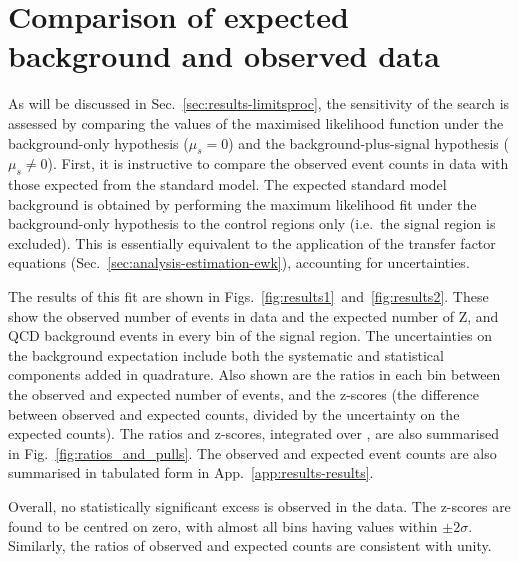 \section{Comparison of expected background and observed data}
\label{sec:results-results}
As will be discussed in Sec.~\ref{sec:results-limitsproc}, the sensitivity of 
the search is assessed by 
comparing the values of the maximised likelihood function under the 
background-only hypothesis ($\mu_s=0$) and the background-plus-signal 
hypothesis ($\mu_s \ne 0$). First, it is instructive to compare the observed 
event counts in 
data with those expected from the standard model. The expected standard model 
background is obtained by performing the maximum likelihood fit under the 
background-only hypothesis to the control regions only (i.e.\ the signal region 
is excluded). This is essentially equivalent to the application of the transfer 
factor equations (Sec.~\ref{sec:analysis-estimation-ewk}), accounting for 
uncertainties.

The results of this fit are shown in 
Figs.~\ref{fig:results1}~and~\ref{fig:results2}.
These show the observed number of events in data and the expected number of 
Z, \ttw and QCD background events in every \njnbhtmht bin of the signal 
region. The uncertainties on the background expectation include both the 
systematic and statistical components added in quadrature. 
Also shown are the ratios in each bin between the observed and expected number 
of events, and the z-scores (the difference between observed and expected 
counts, divided by the uncertainty on the expected counts).
The ratios and z-scores, integrated over \mht, are also summarised in 
Fig.~\ref{fig:ratios_and_pulls}.
The observed and expected event counts are also summarised in tabulated form in 
App.~\ref{app:results-results}.

Overall, no statistically significant excess is observed in the data.
The z-scores are found to be centred on zero, with almost all bins having 
values within $\pm2\sigma$.
Similarly, the ratios of observed and expected counts are consistent with unity.

